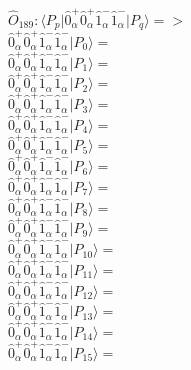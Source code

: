 \documentclass[14pt]{article}
\begin{document}
    $\hat{O}_{189}:  \langle{P_p}\vert \hat{0}_{\alpha}^{+}\hat{0}_{\alpha}^{+}\hat{1}_{\alpha}^{-}\hat{1}_{\alpha}^{-} \vert{P_q}\rangle => $ \\ 
    $ \hat{0}_{\alpha}^{+}\hat{0}_{\alpha}^{+}\hat{1}_{\alpha}^{-}\hat{1}_{\alpha}^{-} \vert{P_{0}}\rangle =  $ \\ 
    $ \hat{0}_{\alpha}^{+}\hat{0}_{\alpha}^{+}\hat{1}_{\alpha}^{-}\hat{1}_{\alpha}^{-} \vert{P_{1}}\rangle =  $ \\ 
    $ \hat{0}_{\alpha}^{+}\hat{0}_{\alpha}^{+}\hat{1}_{\alpha}^{-}\hat{1}_{\alpha}^{-} \vert{P_{2}}\rangle =  $ \\ 
    $ \hat{0}_{\alpha}^{+}\hat{0}_{\alpha}^{+}\hat{1}_{\alpha}^{-}\hat{1}_{\alpha}^{-} \vert{P_{3}}\rangle =  $ \\ 
    $ \hat{0}_{\alpha}^{+}\hat{0}_{\alpha}^{+}\hat{1}_{\alpha}^{-}\hat{1}_{\alpha}^{-} \vert{P_{4}}\rangle =  $ \\ 
    $ \hat{0}_{\alpha}^{+}\hat{0}_{\alpha}^{+}\hat{1}_{\alpha}^{-}\hat{1}_{\alpha}^{-} \vert{P_{5}}\rangle =  $ \\ 
    $ \hat{0}_{\alpha}^{+}\hat{0}_{\alpha}^{+}\hat{1}_{\alpha}^{-}\hat{1}_{\alpha}^{-} \vert{P_{6}}\rangle =  $ \\ 
    $ \hat{0}_{\alpha}^{+}\hat{0}_{\alpha}^{+}\hat{1}_{\alpha}^{-}\hat{1}_{\alpha}^{-} \vert{P_{7}}\rangle =  $ \\ 
    $ \hat{0}_{\alpha}^{+}\hat{0}_{\alpha}^{+}\hat{1}_{\alpha}^{-}\hat{1}_{\alpha}^{-} \vert{P_{8}}\rangle =  $ \\ 
    $ \hat{0}_{\alpha}^{+}\hat{0}_{\alpha}^{+}\hat{1}_{\alpha}^{-}\hat{1}_{\alpha}^{-} \vert{P_{9}}\rangle =  $ \\ 
    $ \hat{0}_{\alpha}^{+}\hat{0}_{\alpha}^{+}\hat{1}_{\alpha}^{-}\hat{1}_{\alpha}^{-} \vert{P_{10}}\rangle =  $ \\ 
    $ \hat{0}_{\alpha}^{+}\hat{0}_{\alpha}^{+}\hat{1}_{\alpha}^{-}\hat{1}_{\alpha}^{-} \vert{P_{11}}\rangle =  $ \\ 
    $ \hat{0}_{\alpha}^{+}\hat{0}_{\alpha}^{+}\hat{1}_{\alpha}^{-}\hat{1}_{\alpha}^{-} \vert{P_{12}}\rangle =  $ \\ 
    $ \hat{0}_{\alpha}^{+}\hat{0}_{\alpha}^{+}\hat{1}_{\alpha}^{-}\hat{1}_{\alpha}^{-} \vert{P_{13}}\rangle =  $ \\ 
    $ \hat{0}_{\alpha}^{+}\hat{0}_{\alpha}^{+}\hat{1}_{\alpha}^{-}\hat{1}_{\alpha}^{-} \vert{P_{14}}\rangle =  $ \\ 
    $ \hat{0}_{\alpha}^{+}\hat{0}_{\alpha}^{+}\hat{1}_{\alpha}^{-}\hat{1}_{\alpha}^{-} \vert{P_{15}}\rangle =  $ \\ 
    
\end{document}
